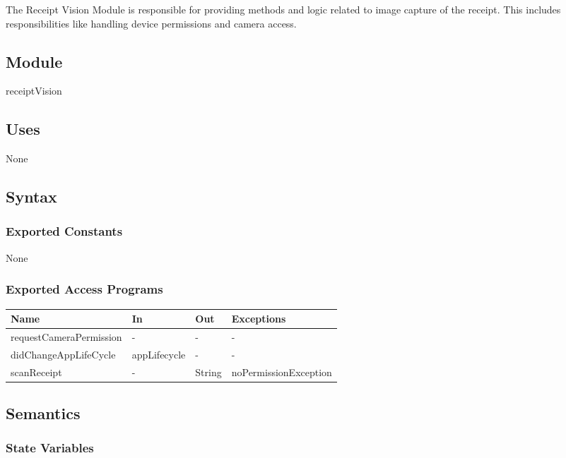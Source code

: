 \documentclass[12pt, titlepage]{article}
\begin{document}
The Receipt Vision Module is responsible for providing methods and logic related to image
capture of the receipt. This includes responsibilities like handling device permissions and camera access.

\subsection{Module}

receiptVision

\subsection{Uses}

None

\subsection{Syntax}

\subsubsection{Exported Constants}

None

\subsubsection{Exported Access Programs}

\begin{center}
  \begin{tabular}{p{5cm} p{4cm} p{3cm} p{4cm}}
  \hline
  \textbf{Name} & \textbf{In} & \textbf{Out} & \textbf{Exceptions} \\
  \hline
  requestCameraPermission & - & - & - \\
  didChangeAppLifeCycle & appLifecycle & - & - \\
  scanReceipt & - & String & noPermissionException \\
  \hline
  \end{tabular}
\end{center}

\subsection{Semantics}

\subsubsection{State Variables}
\end{document}
